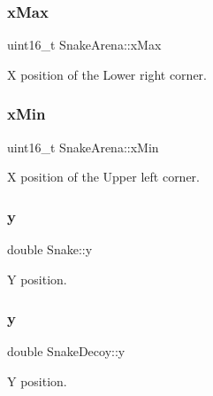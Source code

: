 \mbox{\label{group__snake_ga30a82bd4fdcd55e4ad4c85a597b39e5e}} 
\subsubsection{\texorpdfstring{x\+Max}{xMax}}
{\footnotesize\ttfamily uint16\+\_\+t Snake\+Arena\+::x\+Max}



X position of the Lower right corner. 

\mbox{\label{group__snake_gac0ebaa81c65de20a87951b73f9681ca1}} 
\subsubsection{\texorpdfstring{x\+Min}{xMin}}
{\footnotesize\ttfamily uint16\+\_\+t Snake\+Arena\+::x\+Min}



X position of the Upper left corner. 

\mbox{\label{group__snake_gac2c669473500f0d409a6e809700f537d}} 
\subsubsection{\texorpdfstring{y}{y}\hspace{0.1cm}{\footnotesize\ttfamily [1/3]}}
{\footnotesize\ttfamily double Snake\+::y}



Y position. 

\mbox{\label{group__snake_gad6c137495e858da565b3d7af5c8a480e}} 
\subsubsection{\texorpdfstring{y}{y}\hspace{0.1cm}{\footnotesize\ttfamily [2/3]}}
{\footnotesize\ttfamily double Snake\+Decoy\+::y}



Y position. 

\mbox{\label{group__snake_ga30b2c3c1f048ca6013dcd237e6948f5c}} 
